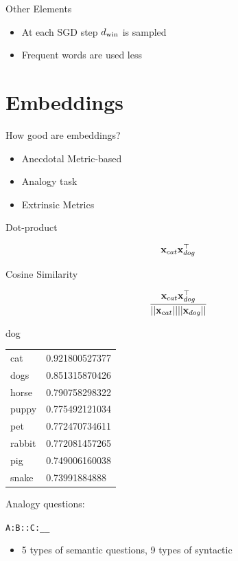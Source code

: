 \documentclass{beamer}
\begin{document}
\begin{frame}{Other Elements}
  \begin{itemize}
  \item At each SGD step ${d_{\mathrm{win}}}$ is sampled

  \item Frequent words are used less
  \end{itemize}
\end{frame}


\section{Embeddings}

\begin{frame}{How good are embeddings?}
  \begin{itemize}
  \item Anecdotal Metric-based
  \item Analogy task
  \item Extrinsic Metrics
  \end{itemize}
\end{frame}

\begin{frame}
  Dot-product

  \[\mathbf{x}_{cat} \mathbf{x}_{dog}^{\top}\]

  Cosine Similarity

  \[\frac{\mathbf{x}_{cat} \mathbf{x}_{dog}^{\top}}{||\mathbf{x}_{cat} || || \mathbf{x}_{dog}||  }\]

\end{frame}

\begin{frame}
  dog
  \begin{tabular}{ll}
  cat &  0.921800527377\\
  dogs & 0.851315870426 \\
  horse & 0.790758298322 \\
  puppy & 0.775492121034 \\
  pet & 0.772470734611 \\
  rabbit& 0.772081457265 \\
  pig& 0.749006160038 \\
  snake & 0.73991884888 \\
  \end{tabular}
\end{frame}

\begin{frame}
  Analogy questions:

  \texttt{A:B::C:\_\_}

  \begin{itemize}
  \item 5 types of semantic questions, 9 types of syntactic
  \end{itemize}
\end{frame}
\end{document}
